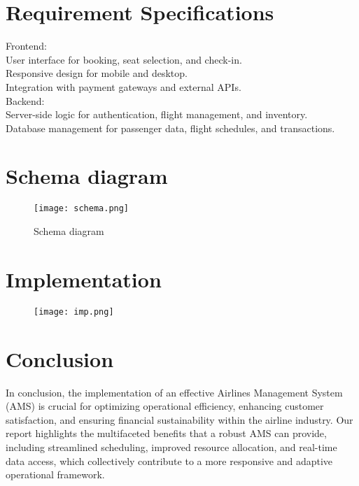 \documentclass{report}
\begin{document}
\chapter{Requirement Specifications}
    Frontend:\\

    User interface for booking, seat selection, and check-in.\\
    Responsive design for mobile and desktop.\\
    Integration with payment gateways and external APIs.\\

    Backend:\\

    Server-side logic for authentication, flight management, and inventory.\\
    Database management for passenger data, flight schedules, and transactions.\\
\chapter{Schema diagram}
\begin{figure}[h]
\centering
\caption{Schema diagram}
\label{fig:schema diagram}
\texttt{[image: schema.png]}
\end{figure}
\chapter{Implementation}
\begin{figure}[h]
\centering
\texttt{[image: imp.png]}
\end{figure}
\chapter{Conclusion}
In conclusion, the implementation of an effective Airlines Management System (AMS) is crucial for optimizing operational efficiency, enhancing customer satisfaction, and ensuring financial sustainability within the airline industry. Our report highlights the multifaceted benefits that a robust AMS can provide, including streamlined scheduling, improved resource allocation, and real-time data access, which collectively contribute to a more responsive and adaptive operational framework.\cite{lopez2010implementation}


\end{document}
